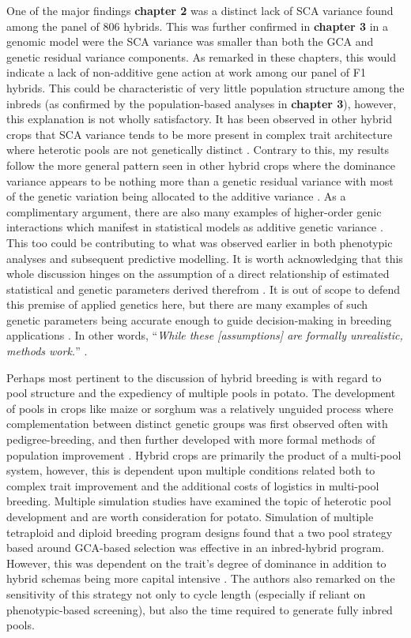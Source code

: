\documentclass[
]{article}
\begin{document}
One of the major findings \textbf{chapter 2} was a distinct lack of SCA
variance found among the panel of 806 hybrids. This was further
confirmed in \textbf{chapter 3} in a genomic model were the SCA variance
was smaller than both the GCA and genetic residual variance components.
As remarked in these chapters, this would indicate a lack of
non-additive gene action at work among our panel of F1 hybrids. This
could be characteristic of very little population structure among the
inbreds (as confirmed by the population-based analyses in
\textbf{chapter 3}), however, this explanation is not wholly
satisfactory. It has been observed in other hybrid crops that SCA
variance tends to be more present in complex trait architecture where
heterotic pools are not genetically distinct \autocite{Zhao2015b}.
Contrary to this, my results follow the more general pattern seen in
other hybrid crops where the dominance variance appears to be nothing
more than a genetic residual variance with most of the genetic variation
being allocated to the additive variance \autocite{Bernardo2016}. As a
complimentary argument, there are also many examples of higher-order
genic interactions which manifest in statistical models as additive
genetic variance \autocite{Hill2008,Monnahan2015}. This too could be
contributing to what was observed earlier in both phenotypic analyses
and subsequent predictive modelling. It is worth acknowledging that this
whole discussion hinges on the assumption of a direct relationship of
estimated statistical and genetic parameters derived therefrom
\autocite{Campos2015}. It is out of scope to defend this premise of
applied genetics here, but there are many examples of such genetic
parameters being accurate enough to guide decision-making in breeding
applications \autocite{Walsh2004,Daetwyler2013}. In other words,
``\emph{While these {[}assumptions{]} are formally unrealistic, methods
work.}'' \autocite{Hill2010}.

Perhaps most pertinent to the discussion of hybrid breeding is with
regard to pool structure and the expediency of multiple pools in potato.
The development of pools in crops like maize or sorghum was a relatively
unguided process where complementation between distinct genetic groups
was first observed often with pedigree-breeding, and then further
developed with more formal methods of population improvement
\autocite{Duvick2004}. Hybrid crops are primarily the product of a
multi-pool system, however, this is dependent upon multiple conditions
related both to complex trait improvement and the additional costs of
logistics in multi-pool breeding. Multiple simulation studies have
examined the topic of heterotic pool development and are worth
consideration for potato. Simulation of multiple tetraploid and diploid
breeding program designs found that a two pool strategy based around
GCA-based selection was effective in an inbred-hybrid program. However,
this was dependent on the trait's degree of dominance in addition to
hybrid schemas being more capital intensive \autocite{Labroo2023}. The
authors also remarked on the sensitivity of this strategy not only to
cycle length (especially if reliant on phenotypic-based screening), but
also the time required to generate fully inbred pools.
\end{document}
